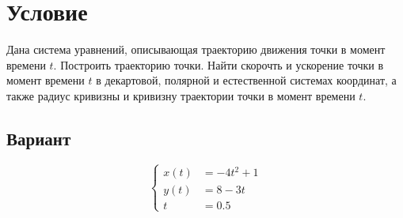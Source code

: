 \section{Условие}
Дана система уравнений, описывающая траекторию движения точки в момент времени $t$.
Построить траекторию точки. Найти скорочть и ускорение точки в момент времени $t$ в
декартовой, полярной и естественной системах координат, а также радиус кривизны и
кривизну траектории точки в момент времени $t$.

\subsection{Вариант}

$$
\begin{cases}
x(t) &= -4t^{2} + 1 \\
y(t) &= 8 - 3t \\
t &= 0.5
\end{cases}
$$
